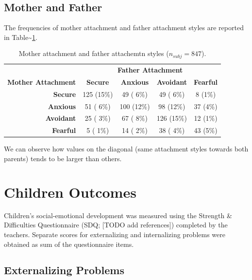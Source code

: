 \documentclass[
]{book}
\begin{document}
\hypertarget{mother-and-father}{%
\subsection{Mother and Father}\label{mother-and-father}}

The frequencies of mother attachment and father attachment styles are reported in Table\textasciitilde\ref{tab:table-cluster-mother-father}.

\begin{table}[!h]

\caption{\label{tab:table-cluster-mother-father}Mother attachment and father attachemtn styles ($n_{subj} = 847$).}
\centering
\begin{tabular}[t]{>{}rcccc}
\toprule
\multicolumn{1}{c}{\textbf{ }} & \multicolumn{4}{c}{\textbf{Father Attachment}} \\
\cmidrule(l{3pt}r{3pt}){2-5}
\textbf{Mother Attachment} & \textbf{Secure} & \textbf{Anxious} & \textbf{Avoidant} & \textbf{Fearful}\\
\midrule
\textbf{Secure} & 125 (15\%) & 49 ( 6\%) & 49 ( 6\%) & 8 (1\%)\\
\textbf{Anxious} & 51 ( 6\%) & 100 (12\%) & 98 (12\%) & 37 (4\%)\\
\textbf{Avoidant} & 25 ( 3\%) & 67 ( 8\%) & 126 (15\%) & 12 (1\%)\\
\textbf{Fearful} & 5 ( 1\%) & 14 ( 2\%) & 38 ( 4\%) & 43 (5\%)\\
\bottomrule
\end{tabular}
\end{table}

We can observe how values on the diagonal (same attachment styles towards both parents) tends to be larger than others.

\hypertarget{children-outcomes}{%
\section{Children Outcomes}\label{children-outcomes}}

Children's social-emotional development was measured using the Strength \& Difficulties Questionnaire (SDQ; {[}TODO add references{]}) completed by the teachers. Separate scores for externalizing and internalizing problems were obtained as sum of the questionnaire items.

\hypertarget{externalizing-problems}{%
\subsection{Externalizing Problems}\label{externalizing-problems}}
\end{document}
